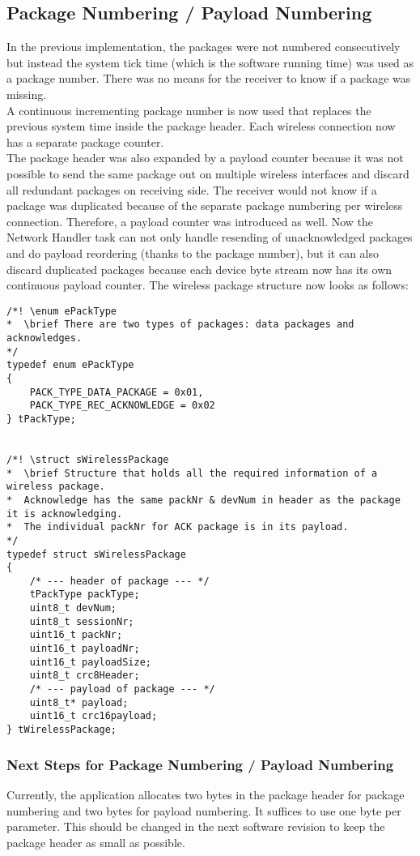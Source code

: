 \subsection{Package Numbering / Payload Numbering}
In the previous implementation, the packages were not numbered consecutively but instead the system tick time (which is the software running time) was used as a package number. There was no means for the receiver to know if a package was missing.\\
A continuous incrementing package number is now used that replaces the previous system time inside the package header. Each wireless connection now has a separate package counter.\\
The package header was also expanded by a payload counter because it was not possible to send the same package out on multiple wireless interfaces and discard all redundant packages on receiving side. The receiver would not know if a package was duplicated because of the separate package numbering per wireless connection. Therefore, a payload counter was introduced as well. Now the Network Handler task can not only handle resending of unacknowledged packages and do payload reordering (thanks to the package number), but it can also discard duplicated packages because each device byte stream now has its own continuous payload counter. The wireless package structure now looks as follows:
\begin{lstlisting}
/*! \enum ePackType
*  \brief There are two types of packages: data packages and acknowledges.
*/
typedef enum ePackType
{
    PACK_TYPE_DATA_PACKAGE = 0x01,
    PACK_TYPE_REC_ACKNOWLEDGE = 0x02
} tPackType;


/*! \struct sWirelessPackage
*  \brief Structure that holds all the required information of a wireless package.
*  Acknowledge has the same packNr & devNum in header as the package it is acknowledging.
*  The individual packNr for ACK package is in its payload.
*/
typedef struct sWirelessPackage
{
    /* --- header of package --- */
    tPackType packType;
    uint8_t devNum;
    uint8_t sessionNr;
    uint16_t packNr;
    uint16_t payloadNr;
    uint16_t payloadSize;
    uint8_t crc8Header;
    /* --- payload of package --- */
    uint8_t* payload;
    uint16_t crc16payload;
} tWirelessPackage;
\end{lstlisting}
%
\subsubsection{Next Steps for Package Numbering / Payload Numbering}
Currently, the application allocates two bytes in the package header for package numbering and two bytes for payload numbering. It suffices to use one byte per parameter. This should be changed in the next software revision to keep the package header as small as possible.
%
%
